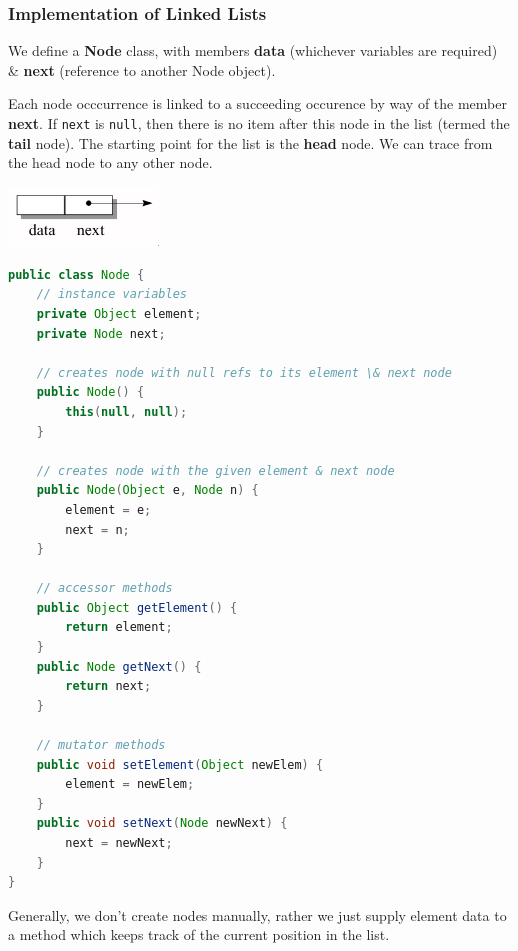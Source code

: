 \documentclass[11pt]{article}
\begin{document}
\subsubsection{Implementation of Linked Lists}
We define a \textbf{Node} class, with members \textbf{data} (whichever variables are required) \& \textbf{next} (reference to another Node object). 

Each node occcurrence is linked to a succeeding occurence by way of the member \textbf{next}. 
If \verb|next| is \verb|null|, then there is no item after this node in the list (termed the \textbf{tail} node). 
The starting point for the list is the \textbf{head} node. 
We can trace from the head node to any other node. 

\begin{center}
    \includegraphics[width=0.3\textwidth]{node.png}
\end{center}

\begin{lstlisting}[language=Java] 
public class Node {
    // instance variables 
    private Object element; 
    private Node next; 

    // creates node with null refs to its element \& next node 
    public Node() {
        this(null, null);
    } 

    // creates node with the given element & next node 
    public Node(Object e, Node n) {
        element = e; 
        next = n; 
    } 

    // accessor methods 
    public Object getElement() {
        return element;
    } 
    public Node getNext() {
        return next; 
    }

    // mutator methods 
    public void setElement(Object newElem) {
        element = newElem; 
    } 
    public void setNext(Node newNext) {
        next = newNext;
    }
}
\end{lstlisting}

Generally, we don't create nodes manually, rather we just supply element data to a method which keeps track of the current position in the list.
\end{document}
